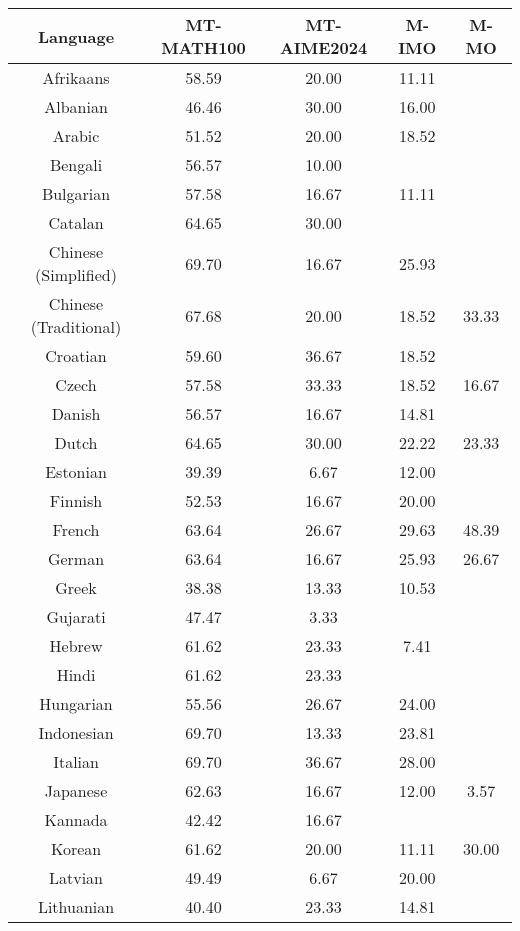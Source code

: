 \begin{table*}[]
\centering
\fontsize{9}{11} \selectfont
\begin{tabular}{c|cccc}
\toprule
\textbf{Language} & \textbf{MT-MATH100} & \textbf{MT-AIME2024} & \textbf{M-IMO} & \textbf{M-MO} \\ \midrule
Afrikaans & 58.59 & 20.00 & 11.11 &  \\
Albanian & 46.46 & 30.00 & 16.00 &  \\
Arabic & 51.52 & 20.00 & 18.52 &  \\
Bengali & 56.57 & 10.00 & \multicolumn{1}{l}{} &  \\
Bulgarian & 57.58 & 16.67 & 11.11 &  \\
Catalan & 64.65 & 30.00 & \multicolumn{1}{l}{} &  \\
Chinese (Simplified) & 69.70 & 16.67 & 25.93 &  \\
Chinese (Traditional) & 67.68 & 20.00 & 18.52 & \multirow{-2}{*}{33.33} \\
Croatian & 59.60 & 36.67 & 18.52 &  \\
Czech & 57.58 & 33.33 & 18.52 & 16.67 \\
Danish & 56.57 & 16.67 & 14.81 &  \\
Dutch & 64.65 & 30.00 & 22.22 & 23.33 \\
Estonian & 39.39 & 6.67 & 12.00 &  \\
Finnish & 52.53 & 16.67 & 20.00 &  \\
French & 63.64 & 26.67 & 29.63 & 48.39 \\
German & 63.64 & 16.67 & 25.93 & 26.67 \\
Greek & 38.38 & 13.33 & 10.53 &  \\
Gujarati & 47.47 & 3.33 & \multicolumn{1}{l}{} &  \\
Hebrew & 61.62 & 23.33 & 7.41 &  \\
Hindi & 61.62 & 23.33 & \multicolumn{1}{l}{} &  \\
Hungarian & 55.56 & 26.67 & 24.00 &  \\
Indonesian & 69.70 & 13.33 & 23.81 &  \\
Italian & 69.70 & 36.67 & 28.00 &  \\
Japanese & 62.63 & 16.67 & 12.00 & 3.57 \\
Kannada & 42.42 & 16.67 & \multicolumn{1}{l}{} &  \\
Korean & 61.62 & 20.00 & 11.11 & 30.00 \\
Latvian & 49.49 & 6.67 & 20.00 &  \\
Lithuanian & 40.40 & 23.33 & 14.81 &  \\

\end{tabular}
\end{table*}
